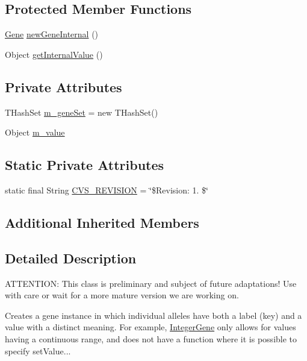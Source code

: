 \subsection*{Protected Member Functions}
\begin{DoxyCompactItemize}
\item 
\hyperlink{interfaceorg_1_1jgap_1_1_gene}{Gene} \hyperlink{classorg_1_1jgap_1_1impl_1_1_set_gene_abe5acebc3f0d099bdb825e6ef7a7c233}{new\-Gene\-Internal} ()
\item 
Object \hyperlink{classorg_1_1jgap_1_1impl_1_1_set_gene_a5877331914ff77741c6bcde9531008a2}{get\-Internal\-Value} ()
\end{DoxyCompactItemize}
\subsection*{Private Attributes}
\begin{DoxyCompactItemize}
\item 
T\-Hash\-Set \hyperlink{classorg_1_1jgap_1_1impl_1_1_set_gene_ad23380d593a6a466d9f85780a120d85f}{m\-\_\-gene\-Set} = new T\-Hash\-Set()
\item 
Object \hyperlink{classorg_1_1jgap_1_1impl_1_1_set_gene_ab52e4cd13d842dab78b1d8668a2853ff}{m\-\_\-value}
\end{DoxyCompactItemize}
\subsection*{Static Private Attributes}
\begin{DoxyCompactItemize}
\item 
static final String \hyperlink{classorg_1_1jgap_1_1impl_1_1_set_gene_a619546d3b881a562d1a7a5f803039ec8}{C\-V\-S\-\_\-\-R\-E\-V\-I\-S\-I\-O\-N} = \char`\"{}\$Revision\-: 1. \$\char`\"{}
\end{DoxyCompactItemize}
\subsection*{Additional Inherited Members}


\subsection{Detailed Description}
A\-T\-T\-E\-N\-T\-I\-O\-N\-: This class is preliminary and subject of future adaptations! Use with care or wait for a more mature version we are working on. 

Creates a gene instance in which individual alleles have both a label (key) and a value with a distinct meaning. For example, \hyperlink{classorg_1_1jgap_1_1impl_1_1_integer_gene}{Integer\-Gene} only allows for values having a continuous range, and does not have a function where it is possible to specify set\-Value...

